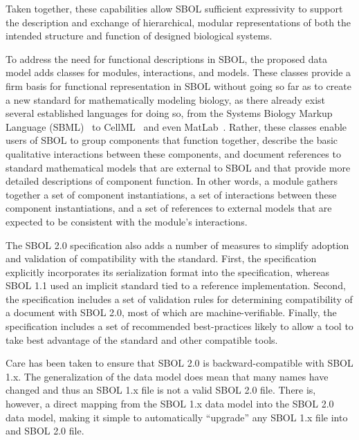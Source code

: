 
Taken together, these capabilities allow SBOL sufficient expressivity to support the description and exchange of hierarchical, modular representations of both the intended structure and function of designed biological systems.

To address the need for functional descriptions in SBOL, the proposed data model adds classes for modules, interactions, and models. These classes provide a firm basis for functional representation in SBOL without going so far as to create a new standard for mathematically modeling biology, as there already exist several established languages for doing so, from the Systems Biology Markup Language (SBML)~\cite{SBML} to CellML~\cite{CellML} and even MatLab~\cite{matlab}. Rather, these classes enable users of SBOL to group components that function together, describe the basic qualitative interactions between these components, and document references to standard mathematical models that are external to SBOL and that provide more detailed descriptions of component function. In other words, a module gathers together a set of component instantiations, a set of interactions between these component instantiations, and a set of references to external models that are expected to be consistent with the module's interactions.


The SBOL 2.0 specification also adds a number of measures to simplify adoption and validation of compatibility with the standard.
First, the specification explicitly incorporates its serialization format into the specification, whereas SBOL 1.1 used an implicit standard tied to a reference implementation.
Second, the specification includes a set of validation rules for determining compatibility of a document with SBOL 2.0, most of which are machine-verifiable.
Finally, the specification includes a set of recommended best-practices likely to allow a tool to take best advantage of the standard and other compatible tools.

Care has been taken to ensure that SBOL 2.0 is backward-compatible with SBOL 1.x.  
The generalization of the data model does mean that many names have changed and thus an SBOL 1.x file is not a valid SBOL 2.0 file.
There is, however, a direct mapping from the SBOL 1.x data model into the SBOL 2.0 data model, making it simple to automatically ``upgrade'' any SBOL 1.x file into and SBOL 2.0 file.

